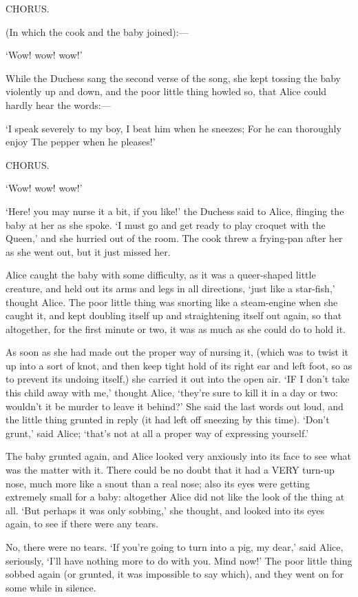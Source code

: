 \documentclass[12pt]{article}
\begin{document}
\begin{Parallel}[p]{}{}
{         CHORUS.

 (In which the cook and the baby joined):—

       ‘Wow! wow! wow!’

While the Duchess sang the second verse of the song, she kept tossing the baby violently up and down, and the poor little thing howled so, that Alice could hardly hear the words:—

   ‘I speak severely to my boy,
    I beat him when he sneezes;
   For he can thoroughly enjoy
    The pepper when he pleases!’

         CHORUS.

       ‘Wow! wow! wow!’

‘Here! you may nurse it a bit, if you like!’ the Duchess said to Alice, flinging the baby at her as she spoke. ‘I must go and get ready to play croquet with the Queen,’ and she hurried out of the room. The cook threw a frying-pan after her as she went out, but it just missed her.

Alice caught the baby with some difficulty, as it was a queer-shaped little creature, and held out its arms and legs in all directions, ‘just like a star-fish,’ thought Alice. The poor little thing was snorting like a steam-engine when she caught it, and kept doubling itself up and straightening itself out again, so that altogether, for the first minute or two, it was as much as she could do to hold it.

As soon as she had made out the proper way of nursing it, (which was to twist it up into a sort of knot, and then keep tight hold of its right ear and left foot, so as to prevent its undoing itself,) she carried it out into the open air. ‘IF I don’t take this child away with me,’ thought Alice, ‘they’re sure to kill it in a day or two: wouldn’t it be murder to leave it behind?’ She said the last words out loud, and the little thing grunted in reply (it had left off sneezing by this time). ‘Don’t grunt,’ said Alice; ‘that’s not at all a proper way of expressing yourself.’

The baby grunted again, and Alice looked very anxiously into its face to see what was the matter with it. There could be no doubt that it had a VERY turn-up nose, much more like a snout than a real nose; also its eyes were getting extremely small for a baby: altogether Alice did not like the look of the thing at all. ‘But perhaps it was only sobbing,’ she thought, and looked into its eyes again, to see if there were any tears.

No, there were no tears. ‘If you’re going to turn into a pig, my dear,’ said Alice, seriously, ‘I’ll have nothing more to do with you. Mind now!’ The poor little thing sobbed again (or grunted, it was impossible to say which), and they went on for some while in silence.

}
\end{Parallel}
\end{document}

